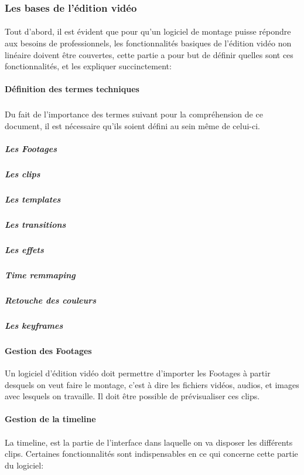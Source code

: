 \subsubsection{Les bases de l'édition vidéo}

\paragraph{}
Tout d'abord, il est évident que pour qu'un logiciel de montage puisse répondre
aux besoins de professionnels, les fonctionnalités basiques de l'édition vidéo
non linéaire doivent être couvertes, cette partie a pour but de définir quelles
sont ces fonctionnalités, et les expliquer succinctement:

\paragraph{Définition des termes techniques}

\subparagraph {}
Du fait de l'importance des termes suivant pour la compréhension de ce document,
il est nécessaire qu'ils soient défini au sein même de celui-ci.

\subparagraph{Les Footages}
\subparagraph{Les clips}
\subparagraph{Les templates}
\subparagraph{Les transitions}
\subparagraph{Les effets}
\subparagraph{Time remmaping}
\subparagraph{Retouche des couleurs}
\subparagraph{Les keyframes}

\paragraph{Gestion des Footages}
Un logiciel d'édition vidéo doit permettre d'importer les Footages à partir %
desquels on veut faire le montage, c'est à dire les fichiers vidéos, audios,
et images avec lesquels on travaille. Il doit être possible de prévisualiser ces
clips.

\paragraph{Gestion de la timeline}
\paragraph{}
La timeline, est la partie de l'interface dans laquelle on va disposer les
différents clips. Certaines fonctionnalités sont indispensables en ce qui
concerne cette partie du logiciel:

